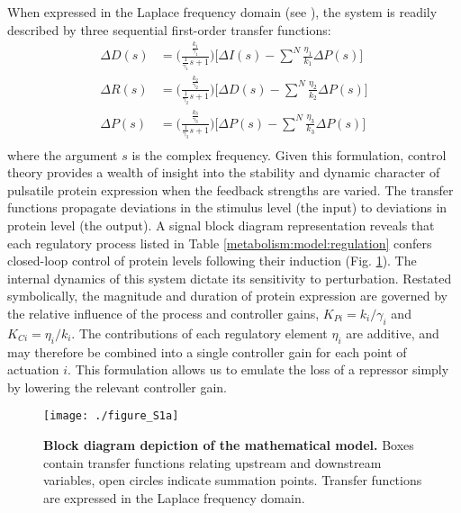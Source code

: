 When expressed in the Laplace frequency domain (see \cite{Seborg2011}), the system is readily described by three sequential first-order transfer functions:
\begin{equation}
\begin{aligned}
\Delta D(s) &= \Big( \frac{\frac{k_1}{\gamma_1}}{\frac{1}{\gamma_1}s+1} \Big) \Big [\Delta I(s) - \sum\limits_{}^{N} \frac{\eta_{1}}{k_1}\Delta P(s) \Big ] \\
\Delta R(s) &= \Big( \frac{\frac{k_2}{\gamma_2}}{\frac{1}{\gamma_2}s+1} \Big) \Big [\Delta D(s) - \sum\limits_{}^{N} \frac{\eta_{2}}{k_2}\Delta P(s) \Big ] \\
\Delta P(s) &= \Big( \frac{\frac{k_3}{\gamma_3}}{\frac{1}{\gamma_3}s+1} \Big) \Big [\Delta P(s) - \sum\limits_{}^{N} \frac{\eta_{3}}{k_3}\Delta P(s) \Big ] \\
\end{aligned}
\end{equation}
where the argument $s$ is the complex frequency. Given this formulation, control theory provides a wealth of insight into the stability and dynamic character of pulsatile protein expression when the feedback strengths are varied. The transfer functions propagate deviations in the stimulus level (the input) to deviations in protein level (the output). A signal block diagram representation reveals that each regulatory process listed in Table \ref{metabolism:model:regulation} confers closed-loop control of protein levels following their induction (Fig. \ref{fig:metabolism:figS1a}). The internal dynamics of this system dictate its sensitivity to perturbation. Restated symbolically, the magnitude and duration of protein expression are governed by the relative influence of the process and controller gains, $K_{Pi} = k_i/\gamma_i$  and $K_{Ci} = \eta_i/k_i$. The contributions of each regulatory element $\eta_i$ are additive, and may therefore be combined into a single controller gain for each point of actuation $i$. This formulation allows us to emulate the loss of a repressor simply by lowering the relevant controller gain.

\begin{figure}[h!]
\centering
\texttt{[image: ./figure\_S1a]}
\captionsetup{width=.65\linewidth}
\caption[Block diagram depiction of the mathematical model.]{\textbf{Block diagram depiction of the mathematical model.} Boxes contain transfer functions relating upstream and downstream variables, open circles indicate summation points. Transfer functions are expressed in the Laplace frequency domain.}
\label{fig:metabolism:figS1a}
\end{figure}

